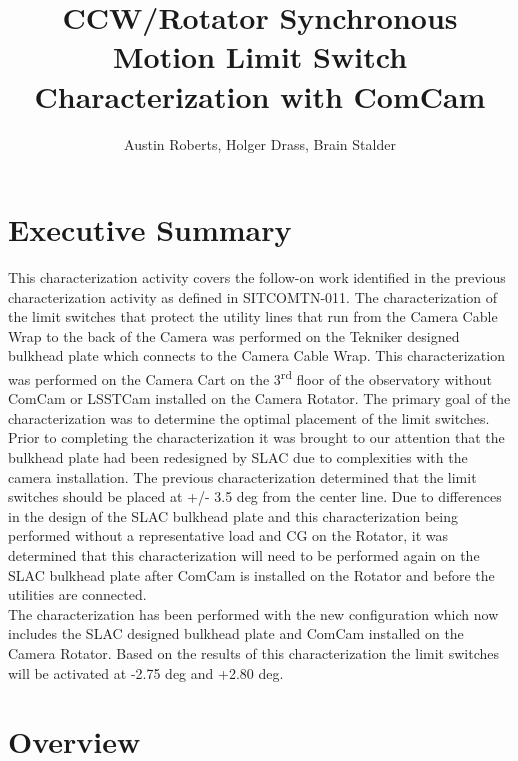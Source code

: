 \documentclass[SE,authoryear,toc, lsstdraft]{lsstdoc}
\title{CCW/Rotator Synchronous Motion Limit Switch Characterization with ComCam}
\author{%
Austin Roberts, Holger Drass, Brain Stalder
}
\date{\vcsDate}
\begin{document}
\maketitle


\section{Executive Summary}

This characterization activity covers the follow-on work identified in the previous characterization
activity as defined in SITCOMTN-011. The characterization of the limit switches that protect the
utility lines that run from the Camera Cable Wrap to the back of the Camera was performed on the
Tekniker designed bulkhead plate which connects to the Camera Cable Wrap. This characterization
was performed on the Camera Cart on the 3\textsuperscript{rd} floor of the observatory without ComCam or LSSTCam
installed on the Camera Rotator. The primary goal of the characterization was to determine the
optimal placement of the limit switches. Prior to completing the characterization it was brought
to our attention that the bulkhead plate had been redesigned by SLAC due to complexities with
the camera installation. The previous characterization determined that the limit switches should
be placed at +/- 3.5 deg from the center line. Due to differences in the design of the SLAC
bulkhead plate and this characterization being performed without a representative load and
CG on the Rotator, it was determined that this characterization will need to be performed
again on the SLAC bulkhead plate after ComCam is installed on the Rotator and before the
utilities are connected.\\
The characterization has been performed with the new configuration which now includes the
SLAC designed bulkhead plate and ComCam installed on the Camera Rotator. Based on the results
of this characterization the limit switches will be activated at -2.75 deg and +2.80 deg.


\section{Overview}
\end{document}
